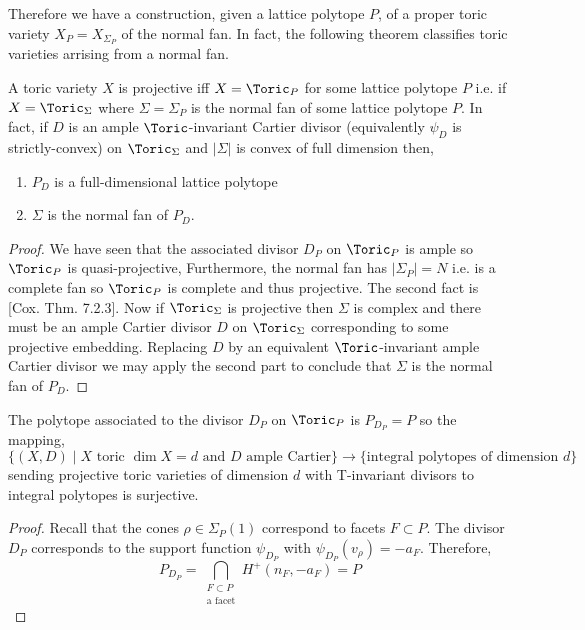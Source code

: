 \begin{remark}
Therefore we have a construction, given a lattice polytope $P$, of a proper toric variety $X_P = X_{\Sigma_P}$ of the normal fan. In fact, the following theorem classifies toric varieties arrising from a normal fan.
\end{remark}


\begin{theorem} \label{projective_normal_fan}
A toric variety $X$ is projective iff $X = \Toric_P$ for some lattice polytope $P$ i.e. if $X = \Toric_\Sigma$ where $\Sigma = \Sigma_P$ is the normal fan of some lattice polytope $P$. In fact, if $D$ is an ample $\Toric$-invariant Cartier divisor (equivalently $\psi_D$ is strictly-convex) on $\Toric_\Sigma$ and $|\Sigma|$ is convex of full dimension then,
\begin{enumerate}
\item $P_D$ is a full-dimensional lattice polytope
\item $\Sigma$ is the normal fan of $P_D$. 
\end{enumerate}
\end{theorem}

\begin{proof}
We have seen that the associated divisor $D_P$ on $\Toric_P$ is ample so $\Toric_P$ is quasi-projective, Furthermore, the normal fan has $|\Sigma_P| = N$ i.e. is a complete fan so $\Toric_P$ is complete and thus projective. The second fact is [Cox. Thm. 7.2.3]. Now if $\Toric_\Sigma$ is projective then $\Sigma$ is complex and there must be an ample Cartier divisor $D$ on $\Toric_\Sigma$ corresponding to some projective embedding. Replacing $D$ by an equivalent $\Toric$-invariant ample Cartier divisor we may apply the second part to conclude that $\Sigma$ is the normal fan of $P_D$. 
\end{proof}

\begin{theorem}
The polytope associated to the divisor $D_P$ on $\Toric_P$ is $P_{D_P} = P$ so the mapping,
\[ \{ (X, D) \mid X \text{ toric } \dim{X} = d \text{ and  } D \text{ ample Cartier} \} \to \{ \text{integral polytopes of dimension } d \} \]
sending projective toric varieties of dimension $d$ with T-invariant divisors to integral polytopes is surjective. 
\end{theorem}

\begin{proof}
Recall that the cones $\rho \in \Sigma_P(1)$ correspond to facets $F \subset P$. 
The divisor $D_P$ corresponds to the support function $\psi_{D_P}$ with $\psi_{D_P}(v_\rho) = - a_F$. Therefore,
\[ P_{D_P} = \bigcap_{\substack{F \subset P \\ \text{a facet}}} H^+(n_F, - a_F) = P \]
\end{proof}

